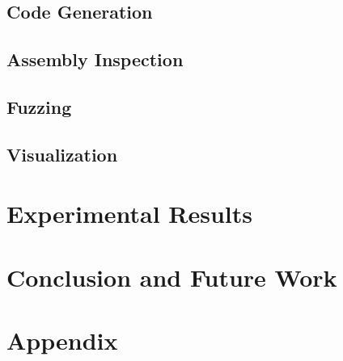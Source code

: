 \documentclass{article}
\begin{document}
\subsection{Code Generation}

\subsection{Assembly Inspection}

\subsection{Fuzzing}

\subsection{Visualization}


\section{Experimental Results}


\section{Conclusion and Future Work}


\pagebreak
{}
{}
 


\pagebreak
{}
{}
\section*{Appendix}
\end{document}
